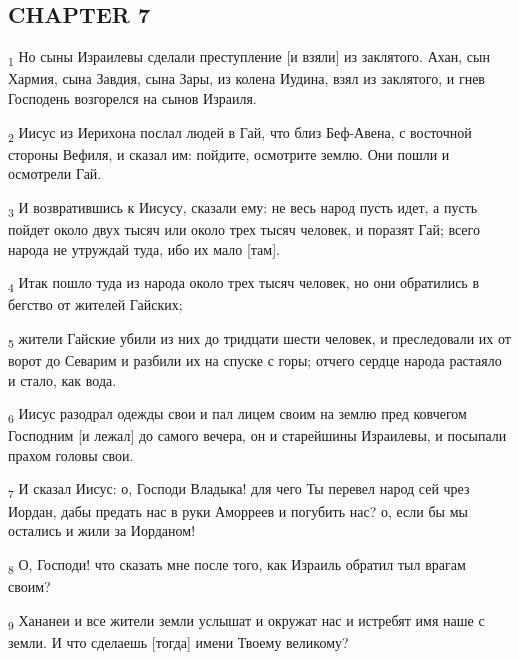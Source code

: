 \subsection{CHAPTER 7}
\begin{tcolorbox}
\textsubscript{1} Но сыны Израилевы сделали преступление [и взяли] из заклятого. Ахан, сын Хармия, сына Завдия, сына Зары, из колена Иудина, взял из заклятого, и гнев Господень возгорелся на сынов Израиля.
\end{tcolorbox}
\begin{tcolorbox}
\textsubscript{2} Иисус из Иерихона послал людей в Гай, что близ Беф-Авена, с восточной стороны Вефиля, и сказал им: пойдите, осмотрите землю. Они пошли и осмотрели Гай.
\end{tcolorbox}
\begin{tcolorbox}
\textsubscript{3} И возвратившись к Иисусу, сказали ему: не весь народ пусть идет, а пусть пойдет около двух тысяч или около трех тысяч человек, и поразят Гай; всего народа не утруждай туда, ибо их мало [там].
\end{tcolorbox}
\begin{tcolorbox}
\textsubscript{4} Итак пошло туда из народа около трех тысяч человек, но они обратились в бегство от жителей Гайских;
\end{tcolorbox}
\begin{tcolorbox}
\textsubscript{5} жители Гайские убили из них до тридцати шести человек, и преследовали их от ворот до Севарим и разбили их на спуске с горы; отчего сердце народа растаяло и стало, как вода.
\end{tcolorbox}
\begin{tcolorbox}
\textsubscript{6} Иисус разодрал одежды свои и пал лицем своим на землю пред ковчегом Господним [и лежал] до самого вечера, он и старейшины Израилевы, и посыпали прахом головы свои.
\end{tcolorbox}
\begin{tcolorbox}
\textsubscript{7} И сказал Иисус: о, Господи Владыка! для чего Ты перевел народ сей чрез Иордан, дабы предать нас в руки Аморреев и погубить нас? о, если бы мы остались и жили за Иорданом!
\end{tcolorbox}
\begin{tcolorbox}
\textsubscript{8} О, Господи! что сказать мне после того, как Израиль обратил тыл врагам своим?
\end{tcolorbox}
\begin{tcolorbox}
\textsubscript{9} Хананеи и все жители земли услышат и окружат нас и истребят имя наше с земли. И что сделаешь [тогда] имени Твоему великому?
\end{tcolorbox}
